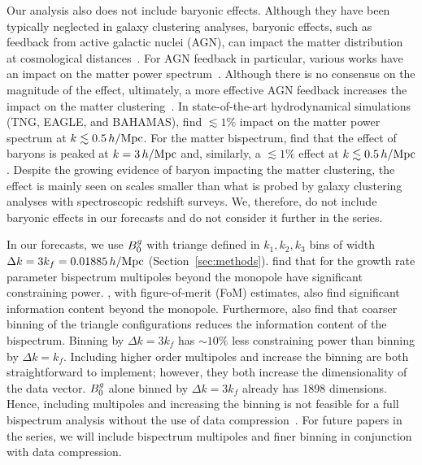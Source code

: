Our analysis also does not include baryonic effects. Although they have been 
typically neglected in galaxy clustering analyses, baryonic effects, such as
feedback from active galactic nuclei (AGN), can impact the matter distribution
at cosmological distances~\citep[\eg][]{white2004, zhan2004, jing2006,
rudd2008, harnois-deraps2015}. %
For AGN feedback in particular, various works have an impact on the matter 
power spectrum~\citep[\eg][]{vandaalen2011, vogelsberger2014, hellwing2016, peters2018,
springel2018, chisari2018, vandaalen2020}. %
Although there is no consensus on the magnitude of the effect, ultimately, a 
more effective AGN feedback increases the impact on the matter 
clustering~\citep{barreira2019}. In state-of-the-art hydrodynamical simulations 
(TNG, EAGLE, and BAHAMAS), \cite{foreman2019} find $\lesssim 1\%$ impact on 
the matter power spectrum at $k \lesssim 0.5\,h/\mathrm{Mpc}$. For the matter bispectrum, 
\cite{foreman2019} find that the effect of baryons is peaked at $k=3\,h/\mathrm{Mpc}$ and, 
similarly, a $\lesssim1\%$ effect at $k \lesssim 0.5\,h/\mathrm{Mpc}$. Despite the growing
evidence of baryon impacting the matter clustering, the effect is mainly seen
on scales smaller than what is probed by galaxy clustering analyses with
spectroscopic redshift surveys. We, therefore, do not include baryonic effects
in our forecasts and do not consider it further in the series. 

In our forecasts, we use $B^g_0$ with triange defined in $k_1,k_2,k_3$ bins of
width $\Delta k = 3 k_f = 0.01885\,h/\mathrm{Mpc}$ (Section~\ref{sec:methods}).
\cite{gagrani2017} find that for the growth rate parameter bispectrum
multipoles beyond the monopole have significant constraining power.  
\cite{yankelevich2019}, with figure-of-merit (FoM) estimates, also find
significant information content beyond the monopole. Furthermore, 
\cite{yankelevich2019} also find that coarser binning of the triangle
configurations reduces the information content of the bispectrum. Binning by
$\Delta k = 3 k_f$ has ${\sim}10\%$ less constraining power than binning by
$\Delta k = k_f$. Including higher order multipoles and increase the binning 
are both straightforward to implement; however, they both increase the 
dimensionality of the data vector. $B^g_0$ alone binned by $\Delta k = 3 k_f$
already has 1898 dimensions. Hence, including multipoles and increasing the
binning is not feasible for a full bispectrum analysis without the use of data
compression~\citep[\eg][]{byun2017, gualdi2018, gualdi2019a, gualdi2019}. 
For future papers in the series, we will include bispectrum multipoles and
finer binning in conjunction with data compression. 


